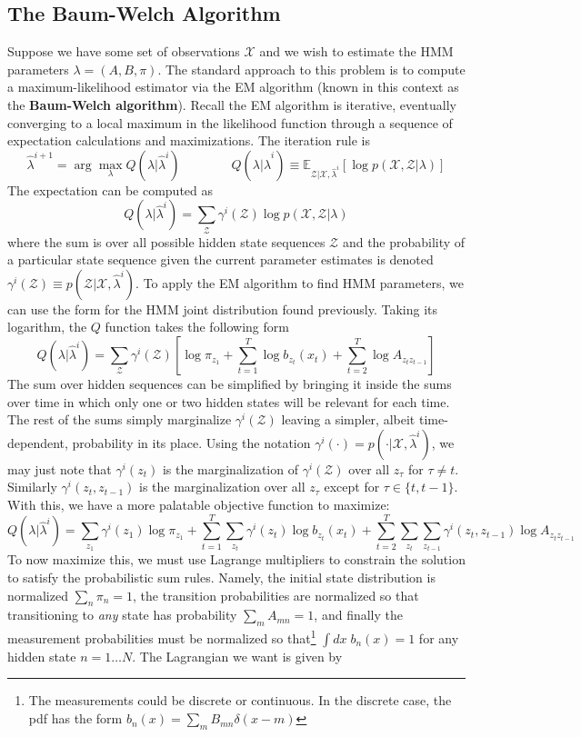 \documentclass[onecolumn]{gwclass}
\begin{document}
	\subsection{The Baum-Welch Algorithm}
	Suppose we have some set of observations $\mathcal{X}$ and we wish to estimate the HMM parameters $\lambda=(A,B,\pi)$. The standard approach to this problem is to compute a maximum-likelihood estimator via the EM algorithm (known in this context as the \textbf{Baum-Welch algorithm}). Recall the EM algorithm is iterative, eventually converging to a local maximum in the likelihood function through a sequence of expectation calculations and maximizations. The iteration rule is
	$$ \hat\lambda^{i+1}=\arg\max_\lambda Q(\lambda|\hat\lambda^i) \qquad\qquad Q(\lambda|\hat\lambda^i)\equiv \mathbb{E}_{\mathcal{Z}|\mathcal{X},\hat\lambda^i}[\log p(\mathcal{X},\mathcal{Z}|\lambda)]$$
	The expectation can be computed as
	$$ Q(\lambda|\hat\lambda^i) = \sum_\mathcal{Z} \gamma^i(\mathcal{Z})\log p(\mathcal{X},\mathcal{Z}|\lambda) $$
	where the sum is over all possible hidden state sequences $\mathcal{Z}$ and the probability of a particular state sequence given the current parameter estimates is denoted $\gamma^i(\mathcal{Z})\equiv p(\mathcal{Z}|\mathcal{X},\hat\lambda^i)$. To apply the EM algorithm to find HMM parameters, we can use the form for the HMM joint distribution found previously. Taking its logarithm, the $Q$ function takes the following form
	$$ Q(\lambda|\hat\lambda^i) = \sum_{\mathcal{Z}}\gamma^i(\mathcal{Z})\left[\log\pi_{z_1} + \sum_{t=1}^T\log b_{z_t}(x_t) + \sum_{t=2}^T \log A_{z_tz_{t-1}}\right] $$
	The sum over hidden sequences can be simplified by bringing it inside the sums over time in which only one or two hidden states will be relevant for each time. The rest of the sums simply marginalize $\gamma^i(\mathcal{Z})$ leaving a simpler, albeit time-dependent, probability in its place. Using the notation $\gamma^i(\cdot) = p(\cdot|\mathcal{X},\hat\lambda^i)$, we may just note that $\gamma^i(z_t)$ is the marginalization of $\gamma^i(\mathcal{Z})$ over all $z_\tau$ for $\tau\neq t$. Similarly $\gamma^i(z_t,z_{t-1})$ is the marginalization over all $z_\tau$ except for $\tau\in\{t,t-1\}$. With this, we have a more palatable objective function to maximize:
	$$ Q(\lambda|\hat\lambda^i) = \sum_{z_1}\gamma^i(z_1)\log\pi_{z_1} + \sum_{t=1}^T\sum_{z_t}\gamma^i(z_t)\log b_{z_t}(x_t) + \sum_{t=2}^T \sum_{z_t}\sum_{z_{t-1}}\gamma^i(z_t,z_{t-1}) \log A_{z_tz_{t-1}} $$
	To now maximize this, we must use Lagrange multipliers to constrain the solution to satisfy the probabilistic sum rules. Namely, the initial state distribution is normalized $\sum_n \pi_n =1$, the transition probabilities are normalized so that transitioning to \emph{any} state has probability $\sum_mA_{mn}=1$, and finally the measurement probabilities must be normalized so that\footnote{The measurements could be discrete or continuous. In the discrete case, the pdf has the form $b_n(x)=\sum_{m}B_{mn}\delta(x-m)$} $\int dx\;b_n(x)=1$ for any hidden state $n=1\dots N$. The Lagrangian we want is given by
\end{document}
